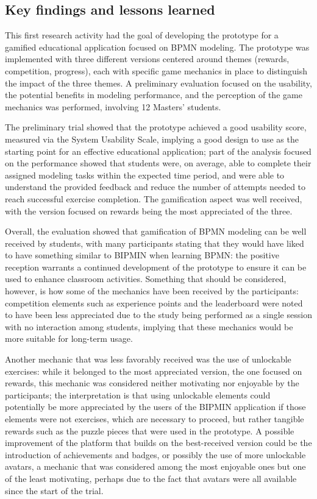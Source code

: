 \subsection{Key findings and lessons learned}

This first research activity had the goal of developing the prototype for a gamified educational application focused on BPMN modeling. The prototype was implemented with three different versions centered around themes (rewards, competition, progress), each with specific game mechanics in place to distinguish the impact of the three themes. A preliminary evaluation focused on the usability, the potential benefits in modeling performance, and the perception of the game mechanics was performed, involving 12 Masters' students.

The preliminary trial showed that the prototype achieved a good usability score, measured via the System Usability Scale, implying a good design to use as the starting point for an effective educational application; part of the analysis focused on the performance showed that students were, on average, able to complete their assigned modeling tasks within the expected time period, and were able to understand the provided feedback and reduce the number of attempts needed to reach successful exercise completion. The gamification aspect was well received, with the version focused on rewards being the most appreciated of the three.

Overall, the evaluation showed that gamification of BPMN modeling can be well received by students, with many participants stating that they would have liked to have something similar to BIPMIN when learning BPMN: the positive reception warrants a continued development of the prototype to ensure it can be used to enhance classroom activities. Something that should be considered, however, is how some of the mechanics have been received by the participants: competition elements such as experience points and the leaderboard were noted to have been less appreciated due to the study being performed as a single session with no interaction among students, implying that these mechanics would be more suitable for long-term usage.

Another mechanic that was less favorably received was the use of unlockable exercises: while it belonged to the most appreciated version, the one focused on rewards, this mechanic was considered neither motivating nor enjoyable by the participants; the interpretation is that using unlockable elements could potentially be more appreciated by the users of the BIPMIN application if those elements were not exercises, which are necessary to proceed, but rather tangible rewards such as the puzzle pieces that were used in the prototype. A possible improvement of the platform that builds on the best-received version could be the introduction of achievements and badges, or possibly the use of more unlockable avatars, a mechanic that was considered among the most enjoyable ones but one of the least motivating, perhaps due to the fact that avatars were all available since the start of the trial.

